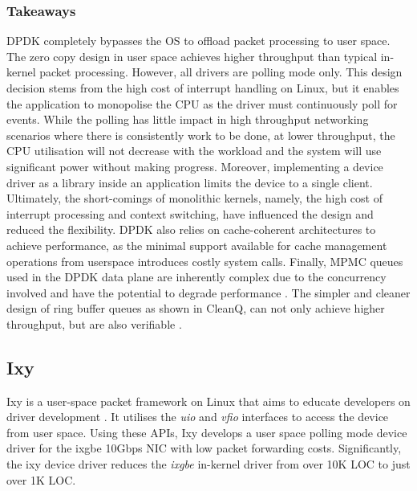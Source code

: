 \subsubsection{Takeaways}
DPDK completely bypasses the OS to offload packet processing to user space. The zero copy design in user space
achieves higher throughput than typical in-kernel packet processing\cite{DPDK:wp_20}. However, all drivers 
are polling mode only. This design decision stems from the high cost of interrupt handling on Linux, but it enables
the application to monopolise the CPU as the driver must continuously poll for events. While the polling has little
impact in high throughput networking scenarios where there is consistently work to be done, at lower throughput,
the CPU utilisation will not decrease with the workload and the system will use significant power without
making progress. Moreover, implementing a device driver as a library inside an application limits the device to a
single client. Ultimately, the short-comings of monolithic kernels, namely, the high cost of interrupt processing
and context switching, have influenced the design and reduced the flexibility. DPDK also relies on cache-coherent
architectures to achieve performance, as the minimal support available for cache management operations from userspace
introduces costly system calls. Finally, MPMC queues used in the DPDK data plane are inherently complex due to the 
concurrency involved and have the potential to degrade performance \cite{Wang_BFOOLCHC_22}. The simpler and
cleaner design of ring buffer queues as shown in CleanQ, can not only achieve higher throughput, but are also
verifiable \cite{Haecki_HACSR_19}.

\subsection{Ixy}
Ixy is a user-space packet framework on Linux that aims to educate developers on driver development 
\cite{Emmerich_PBHZC_19}. It utilises the \emph{uio} and \emph{vfio} interfaces to access the device from
user space. Using these APIs, Ixy develops a user space polling mode device driver for the ixgbe 10Gbps
NIC with low packet forwarding costs. Significantly, the ixy device driver reduces the \emph{ixgbe}
in-kernel driver from over 10K LOC to just over 1K LOC.

